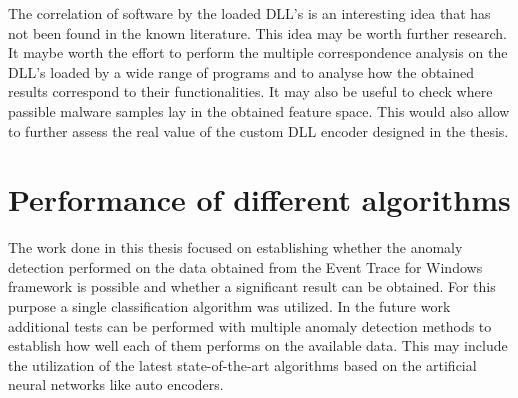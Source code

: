 \documentclass[a4paper,twoside,12pt]{book}
\newcounter{PagesWithoutNumbers}
\begin{document}
The correlation of software by the loaded DLL's is an interesting idea that has not been
found in the known literature. This idea may be worth further research. It maybe worth
the effort to perform the multiple correspondence analysis on the DLL's loaded by a wide range 
of programs and to analyse how the obtained results correspond to their functionalities. It may also
be useful to check where passible malware samples lay in the obtained feature space. This would also
allow to further assess the real value of the custom DLL encoder designed in the thesis. 

\section{Performance of different algorithms}

The work done in this thesis focused on establishing whether the anomaly detection performed on the
data obtained from the Event Trace for Windows framework is possible and whether a significant result
can be obtained. For this purpose a single classification algorithm was utilized. In the future work 
additional tests can be performed with multiple anomaly detection methods to establish how well each 
of them performs on the available data. This may include the utilization of the latest state-of-the-art 
algorithms based on the artificial neural networks like auto encoders.






\backmatter
{}
\setcounter{page}{\value{PagesWithoutNumbers}}

\pagestyle{onlyPageNumbers}




\end{document}
